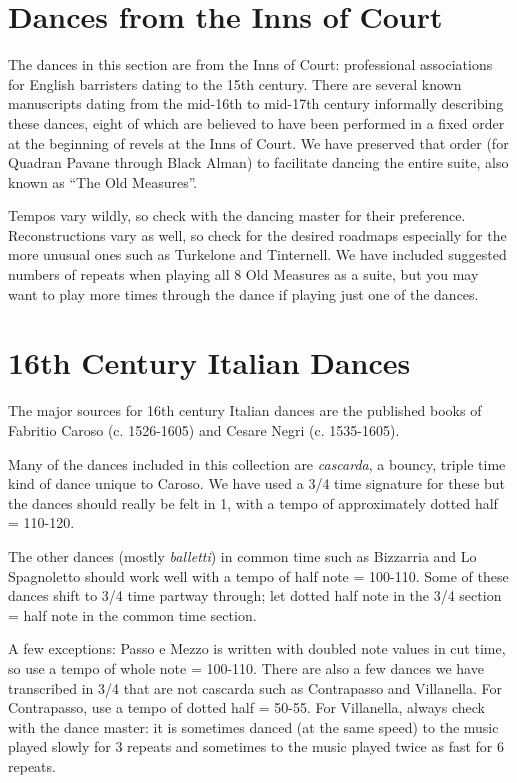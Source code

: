 \documentclass[11pt]{book}
\begin{document}
\clearpage


\chapter{Dances from the Inns of Court}

The dances in this section are from the Inns of Court: professional
associations for English barristers dating to the 15th century. There are
several known manuscripts dating from the mid-16th to mid-17th century
informally describing these dances, eight of which are believed to have been
performed in a fixed order at the beginning of revels at the Inns of Court. We
have preserved that order (for Quadran Pavane through Black Alman) to
facilitate dancing the entire suite, also known as ``The Old Measures''.

Tempos vary wildly, so check with the dancing master for their preference.
Reconstructions vary as well, so check for the desired roadmaps especially for
the more unusual ones such as Turkelone and Tinternell. We have included
suggested numbers of repeats when playing all 8 Old Measures as a suite, but
you may want to play more times through the dance if playing just one of the
dances.

\clearpage


\chapter{16th Century Italian Dances}

The major sources for 16th century Italian dances are the published books of
Fabritio Caroso (c. 1526-1605) and Cesare Negri (c. 1535-1605).

Many of the dances included in this collection are {\em cascarda}, a bouncy,
triple time kind of dance unique to Caroso. We have used a 3/4 time signature
for these but the dances should really be felt in 1, with a tempo of
approximately dotted half = 110-120.

The other dances (mostly {\em balletti}) in common time such as Bizzarria and
Lo Spagnoletto should work well with a tempo of half note = 100-110. Some of
these dances shift to 3/4 time partway through; let dotted half note in the 3/4
section = half note in the common time section. 

A few exceptions: Passo e Mezzo is written with doubled note values in cut
time, so use a tempo of whole note = 100-110. There are also a few dances we
have transcribed in 3/4 that are not cascarda such as Contrapasso and
Villanella. For Contrapasso, use a tempo of dotted half = 50-55. For
Villanella, always check with the dance master: it is sometimes danced (at the
same speed) to the music played slowly for 3 repeats and sometimes to the music
played twice as fast for 6 repeats. 
\end{document}
